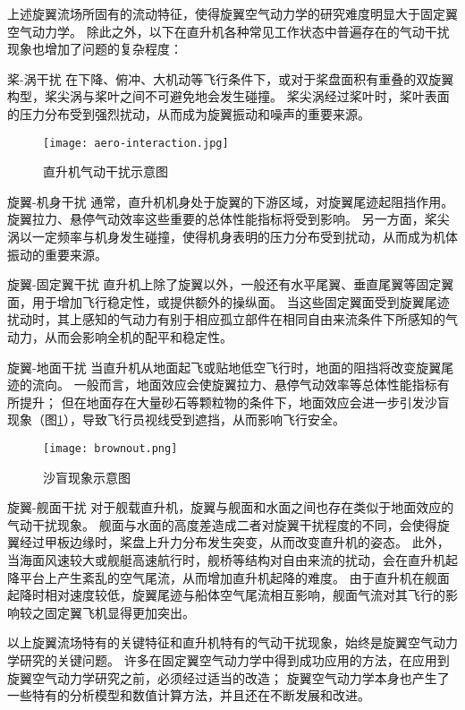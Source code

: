 \documentclass[doctor,openright,twoside,color]{buaathesis}
\begin{document}
上述旋翼流场所固有的流动特征，使得旋翼空气动力学的研究难度明显大于固定翼空气动力学。
除此之外，以下在直升机各种常见工作状态中普遍存在的气动干扰现象也增加了问题的复杂程度：
\begin{compactdesc}
  \item[桨-涡干扰]
  在下降、俯冲、大机动等飞行条件下，或对于桨盘面积有重叠的双旋翼构型，桨尖涡与桨叶之间不可避免地会发生碰撞。
  桨尖涡经过桨叶时，桨叶表面的压力分布受到强烈扰动，从而成为旋翼振动和噪声的重要来源。
\begin{figure}[t!]
    \centering
    \texttt{[image: aero-interaction.jpg]}
    \caption{直升机气动干扰示意图}
\end{figure}
  \item[旋翼-机身干扰]
  通常，直升机机身处于旋翼的下游区域，对旋翼尾迹起阻挡作用。
  旋翼拉力、悬停气动效率这些重要的总体性能指标将受到影响。
  另一方面，桨尖涡以一定频率与机身发生碰撞，使得机身表明的压力分布受到扰动，从而成为机体振动的重要来源。
  \item[旋翼-固定翼干扰]
  直升机上除了旋翼以外，一般还有水平尾翼、垂直尾翼等固定翼面，用于增加飞行稳定性，或提供额外的操纵面。
  当这些固定翼面受到旋翼尾迹扰动时，其上感知的气动力有别于相应孤立部件在相同自由来流条件下所感知的气动力，从而会影响全机的配平和稳定性。
  \item[旋翼-地面干扰]
  当直升机从地面起飞或贴地低空飞行时，地面的阻挡将改变旋翼尾迹的流向。
一般而言，地面效应会使旋翼拉力、悬停气动效率等总体性能指标有所提升；
  但在地面存在大量砂石等颗粒物的条件下，地面效应会进一步引发沙盲现象（图\ref{brownout}），导致飞行员视线受到遮挡，从而影响飞行安全。
\begin{figure}[t!]
    \centering
    \texttt{[image: brownout.png]}
    \caption{沙盲现象示意图}\label{brownout}
\end{figure}
  \item[旋翼-舰面干扰]
  对于舰载直升机，旋翼与舰面和水面之间也存在类似于地面效应的气动干扰现象。
  舰面与水面的高度差造成二者对旋翼干扰程度的不同，会使得旋翼经过甲板边缘时，桨盘上升力分布发生突变，从而改变直升机的姿态。  
  此外，当海面风速较大或舰艇高速航行时，舰桥等结构对自由来流的扰动，会在直升机起降平台上产生紊乱的空气尾流，从而增加直升机起降的难度。
  由于直升机在舰面起降时相对速度较低，旋翼尾迹与船体空气尾流相互影响，舰面气流对其飞行的影响较之固定翼飞机显得更加突出。
\end{compactdesc}

以上旋翼流场特有的关键特征和直升机特有的气动干扰现象，始终是旋翼空气动力学研究的关键问题。
许多在固定翼空气动力学中得到成功应用的方法，在应用到旋翼空气动力学研究之前，必须经过适当的改造；
旋翼空气动力学本身也产生了一些特有的分析模型和数值计算方法，并且还在不断发展和改进。
\end{document}
